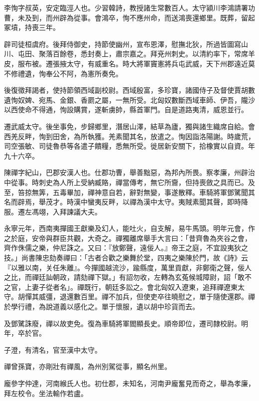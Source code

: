 
\begin{pinyinscope}
李恂字叔英，安定臨涇人也。少習韓詩，教授諸生常數百人。太守潁川李鴻請署功曹，未及到，而州辟為從事。會鴻卒，恂不應州命，而送鴻喪還鄉里。既葬，留起冢墳，持喪三年。

辟司徒桓虞府。後拜侍御史，持節使幽州，宣布恩澤，慰撫北狄，所過皆圖寫山川、屯田、聚落百餘卷，悉封奏上，肅宗嘉之。拜兗州刺史。以清約率下，常席羊皮，服布被。遷張掖太守，有威重名。時大將軍竇憲將兵屯武威，天下州郡遠近莫不修禮遺，恂奉公不阿，為憲所奏免。

後復徵拜謁者，使持節領西域副校尉。西域殷富，多珍寶，諸國侍子及督使賈胡數遺恂奴婢、宛馬、金銀、香罽之屬，一無所受。北匈奴數斷西域車師、伊吾，隴沙以西使命不得通，恂設購賞，遂斬虜帥，縣首軍門。自是道路夷清，威恩並行。

遷武威太守。後坐事免，步歸鄉里，潛居山澤，結草為廬，獨與諸生織席自給。會西羌反畔，恂到田舍，為所執獲。羌素聞其名，放遣之。恂因詣洛陽謝。時歲荒，司空張敏、司徒魯恭等各遣子饋糧，悉無所受。徙居新安關下，拾橡實以自資。年九十六卒。

陳禪字紀山，巴郡安漢人也。仕郡功曹，舉善黜惡，為邦內所畏。察孝廉，州辟治中從事。時刺史為人所上受納臧賂，禪當傳考，無它所齎，但持喪斂之具而已。及至，笞掠無筭，五毒畢加，禪神意自若，辭對無變，事遂散釋。車騎將軍鄧騭聞其名而辟焉，舉茂才。時漢中蠻夷反畔，以禪為漢中太守。夷賊素聞其聲，即時降服。遷左馮翊，入拜諫議大夫。

永寧元年，西南夷撣國王獻樂及幻人，能吐火，自支解，易牛馬頭。明年元會，作之於庭，安帝與群臣共觀，大奇之。禪獨離席舉手大言曰：「昔齊魯為夾谷之會，齊作侏儒之樂，仲尼誅之。又曰：『放鄭聲，遠佞人。』帝王之庭，不宜設夷狄之技。」尚書陳忠劾奏禪曰：「古者合歡之樂舞於堂，四夷之樂陳於門，故《詩》云『以雅以南，关任朱離』。今撣國越流沙，踰縣度，萬里貢獻，非鄭衛之聲，佞人之比，而禪廷訕朝政，請劾禪下獄。」有詔勿收，左轉為玄菟候城障尉，詔「敢不之官，上妻子從者名」。禪既行，朝廷多訟之。會北匈奴入遼東，追拜禪遼東太守。胡憚其威彊，退還數百里。禪不加兵，但使吏卒往曉慰之，單于隨使還郡。禪於學行禮，為說道義以感化之。單于懷服，遺以胡中珍貨而去。

及鄧騭誅廢，禪以故吏免。復為車騎將軍閻顯長史。順帝即位，遷司隸校尉。明年，卒於官。

子澄，有清名，官至漢中太守。

禪曾孫寶，亦剛壯有禪風，為州別駕從事，顯名州里。

龐參字仲達，河南緱氏人也。初仕郡，未知名，河南尹龐奮見而奇之，舉為孝廉，拜左校令。坐法輸作若盧。


\end{pinyinscope}
